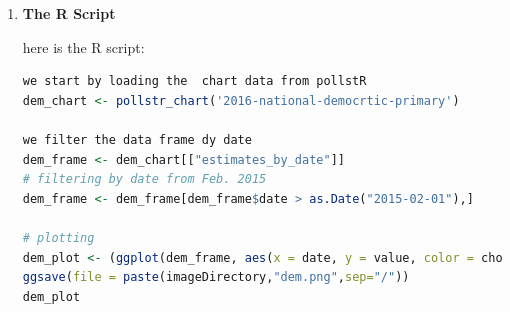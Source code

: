 \documentclass{article}[14pt]
\begin{document}
\begin{section}
\begin{enumerate}[]
\item {\bf The R Script} %


here is the R script:
\begin{lstlisting}[language = R]
we start by loading the  chart data from pollstR
dem_chart <- pollstr_chart('2016-national-democrtic-primary')

we filter the data frame dy date
dem_frame <- dem_chart[["estimates_by_date"]]
# filtering by date from Feb. 2015
dem_frame <- dem_frame[dem_frame$date > as.Date("2015-02-01"),]

# plotting
dem_plot <- (ggplot(dem_frame, aes(x = date, y = value, color = choice))+ geom_line())
ggsave(file = paste(imageDirectory,"dem.png",sep="/"))
dem_plot
\end{lstlisting}
\end{enumerate}

\end{section}
\end{document}
